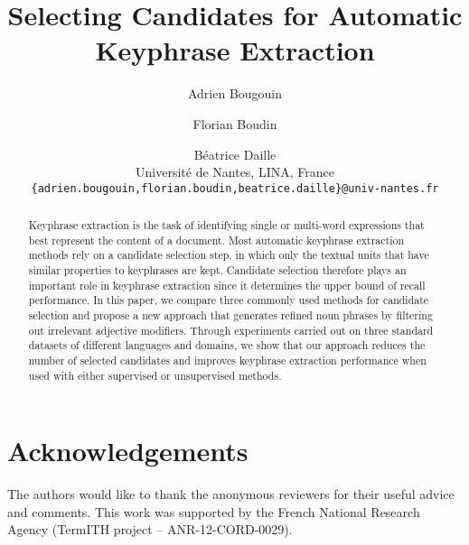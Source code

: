 \documentclass[11pt]{article}
\title{Selecting Candidates for Automatic Keyphrase Extraction}
\author{
  Adrien Bougouin \and Florian Boudin \and Béatrice Daille\\
  Université de Nantes, LINA, France\\
  {\tt \{adrien.bougouin,florian.boudin,beatrice.daille\}@univ-nantes.fr}
}
\date{}
\begin{document}
  \maketitle
  \begin{abstract}
    Keyphrase extraction is the task of identifying single or multi-word expressions that best represent the content of a document. 
    Most automatic keyphrase extraction methods rely on a candidate selection step, in which only the textual units that have similar properties to keyphrases are kept.
    Candidate selection therefore plays an important role in keyphrase extraction since it determines the upper bound of recall performance. %
    In this paper, we compare three commonly used methods for candidate selection and propose a new approach that generates refined noun phrases by filtering out irrelevant adjective modifiers.
    Through experiments carried out on three standard datasets of different languages and domains, we show that our approach reduces the number of selected candidates and improves keyphrase extraction performance when used with either supervised or unsupervised methods.
  \end{abstract}

  

  \section*{Acknowledgements}
  The authors would like to thank the anonymous reviewers for their useful
  advice and comments. This work was supported by the French National Research
  Agency (TermITH project -- ANR-12-CORD-0029).

  
  
\end{document}
